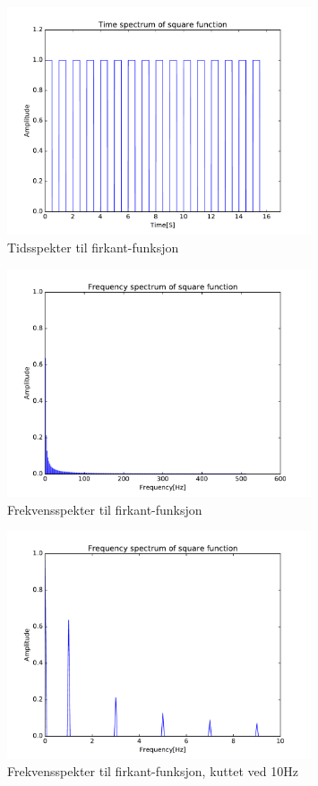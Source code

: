 \documentclass[12p,a4paper]{article}
\begin{document}
\begin{figure}[H]
\centering
\includegraphics[width=0.8\textwidth]{fig/squaretimespec.pdf}
\caption{Tidsspekter til firkant-funksjon}
\label{fig:square_timespec}
\end{figure}

\begin{figure}[H]
\centering
\includegraphics[width=0.8\textwidth]{fig/squarefreqspec1.pdf}
\caption{Frekvensspekter til firkant-funksjon}
\label{fig:square_freqspec1}
\end{figure}

\begin{figure}[H]
\centering
\includegraphics[width=0.8\textwidth]{fig/squarefreqspec2.pdf}
\caption{Frekvensspekter til firkant-funksjon, kuttet ved 10Hz}
\label{fig:square_freqspec2}
\end{figure}
\end{document}
